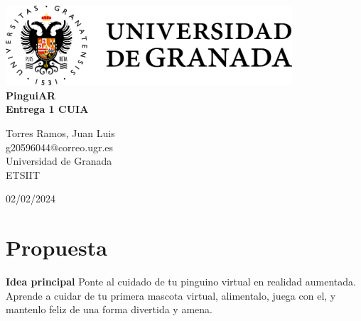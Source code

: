 \documentclass{article}
\begin{document}
\begin{center}
  \vspace*{0.5\baselineskip} %
  \includegraphics[width=0.8\textwidth]{ugr-2.png}\\
  \vfill
  {\Huge \textbf{PinguiAR}}\\ %
  \vspace*{2\baselineskip}
  {\LARGE \textbf{Entrega 1 CUIA}}\\
  \begin{large}
    \vspace*{1\baselineskip}
    {\Large Torres Ramos, Juan Luis \\}
	\vspace*{0.5\baselineskip}
    {{ g20596044@correo.ugr.es}}\\[1cm]
    \vfill
	{Universidad de Granada}\\
    {\large ETSIIT}\par
	{\large 02/02/2024}\par
	\vspace*{3\baselineskip}
  \end{large}
  \thispagestyle{empty} 
\end{center}
\pagebreak









\setcounter{page}{1}

\section{Propuesta}
\label{Propuesta}
\textbf{Idea principal}
\vskip 0.1in
Ponte al cuidado de tu pinguino virtual en realidad aumentada. Aprende a cuidar de tu primera mascota virtual, alimentalo, juega con el, y mantenlo feliz de una forma divertida y amena.
\vspace*{1\baselineskip}
\end{document}
